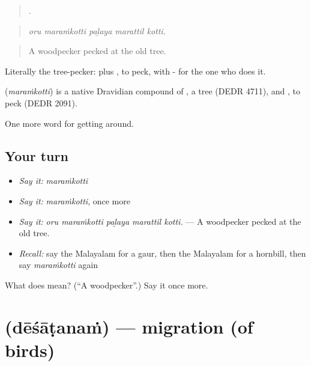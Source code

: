 \begin{quote}
    .
\end{quote}

\begin{quote}
\emph{oru maraṁkotti paḻaya marattil kotti.}
\end{quote}

\begin{quote}
A woodpecker pecked at the old tree.
\end{quote}

Literally the tree-pecker:  plus , to peck, with - for the one who does it.

\begin{cousinweb}
\textbf{} (\emph{maraṁkotti}) is a native Dravidian compound of , a tree (DEDR 4711), and , to peck (DEDR 2091).
\end{cousinweb}

\begin{grammarlens}[title={What you've built}]
One more word for getting around.
\end{grammarlens}

\subsection*{Your turn}
\begin{itemize}
\raggedright
  \item \emph{Say it:} \emph{maraṁkotti}
  \item \emph{Say it:} \emph{maraṁkotti}, once more
  \item \emph{Say it:} \emph{oru maraṁkotti paḻaya marattil kotti.} — A woodpecker pecked at the old tree.
  \item \emph{Recall:} say the Malayalam for a gaur, then the Malayalam for a hornbill, then say \emph{maraṁkotti} again
\end{itemize}

\begin{tcolorbox}[breakable,colback=teal!4,colframe=teal!35!black,title={Before you move on}]
What does  mean? (\textquotedblleft{}A woodpecker\textquotedblright{}.) Say it once more.
\end{tcolorbox}
\section[\texorpdfstring{\ml{ദേശാടനം} (dēśāṭanaṁ)}{ദേശാടനം (dēśāṭanaṁ)}]{ (dēśāṭanaṁ) — migration (of birds)}

